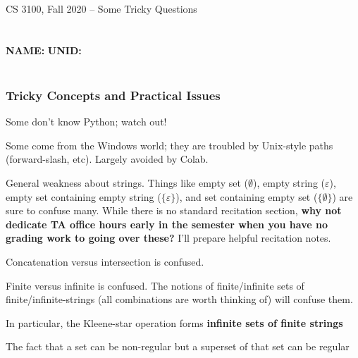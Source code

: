 \documentclass[12pt]{article}
\begin{document}



\begin{center}
\begin{large}
  CS 3100, Fall 2020 -- Some Tricky Questions \\
  \ \\
  \ \\  
      {  {\Large\bf NAME: } \hfill {\Large\bf UNID: }\hspace{4cm} }
      \ \\
  \ \\      
\end{large}


\end{center}
\date{}

\subsubsection*{Tricky Concepts and Practical Issues}

\begin{compactitem}
\item Some don't know Python; watch out!
\item Some come from the Windows world; they are troubled
  by Unix-style paths (forward-slash, etc). Largely avoided by
  Colab.
\item General weakness about strings. Things like
  empty set ($\emptyset$),
  empty string ($\varepsilon$),
  empty set containing empty string ($\{\varepsilon\}$),
  and set containing empty set  ($\{\emptyset\}$)
  are sure to confuse many.
  While there is no standard recitation section,
  {\bf why not dedicate TA office hours early in the semester
    when you have no grading work to going over these?}
  I'll prepare helpful recitation notes.
  
\item Concatenation versus intersection is confused.
\item Finite versus infinite is confused. The notions of
  finite/infinite sets of finite/infinite-strings (all combinations
  are worth thinking of) will confuse them.
\item In particular, the Kleene-star
  operation forms {\bf infinite sets of finite strings} 
\item The fact that a set can be non-regular but a superset
  of that set can be regular

\end{compactitem}
\end{document}
